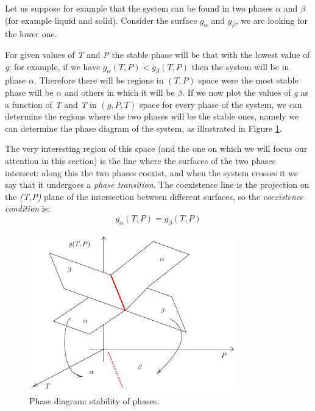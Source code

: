 \documentclass[../main/main.tex]{subfiles}
\begin{document}
Let us suppose for example that the system can be found in two phases \( \alpha  \)  and \( \beta  \)  (for example liquid and solid).
Consider the surface \( g_ \alpha  \) and \( g_ \beta  \), we are looking for the lower one.

For given values of \emph{T}  and \emph{P}  the stable phase will be that with the lowest value of \emph{g}: for example, if we have \( g_{\alpha } (T,P) < g_{\beta} (T,P) \) then the system will be in phase \( \alpha  \). Therefore there will be regions in \( (T,P) \)  space were the most stable phase will be \( \alpha  \)  and others in which it will be \( \beta  \).
If we now plot the values of \emph{g}  as a function of \emph{T}  and \emph{T}  in \( (g,P,T) \)  space for every phase of the system, we can determine the regions where the two phases will be the stable ones, namely we can determine the phase diagram of the system, as illustrated in  Figure \ref{fig:2_1}.

The very interesting region of this space (and the one on which we will focus our attention in this section) is the line where the surfaces of the two phases intersect: along this the two phases coexist, and when the system crosses it we say that it undergoes a \textit{phase transition}.
The coexistence line is the projection on the \emph{(T,P)} plane of the intersection between different surfaces, so the \textit{coexistence condition} is:
\begin{equation}
g_ \alpha(T,P) = g_ \beta(T,P)
  \label{eq:}
\end{equation}


\begin{figure}[h!]
\centering
\includegraphics[width=0.8\textwidth]{../lessons/2_image/1.pdf}
\caption{\label{fig:2_1} Phase diagram: stability of phases.}
\end{figure}
\end{document}
